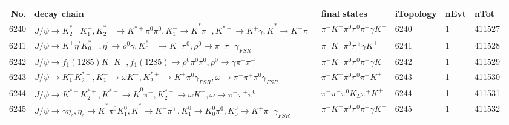 \begin{table}[htbp] 
\begin{center}
\begin{small}
\begin{tabular}{rlllll}\hline\hline
 No. & decay chain & final states &  iTopology & nEvt & nTot \\\hline
6240&$J/\psi       \rightarrow K_2^{*+}       K_{1}^{-}      , K_2^{*+}        \rightarrow K^{*+}         \pi^{0}        \pi^{0}        , K_{1}^{-}       \rightarrow \bar{K}^{*}   \pi^{-}        , K^{*+}          \rightarrow K^{+}          \gamma       , \bar{K}^{*}    \rightarrow K^{-}          \pi^{+}        $&$\pi^{-}        K^{-}          \pi^{0}        \pi^{0}        \pi^{+}        \gamma       K^{+}          $& 6240&    1&411527\\
6241&$J/\psi       \rightarrow K^{+}          \eta^{\prime} K_{0}^{*-}     , \eta^{\prime}  \rightarrow \rho^{0}      \gamma       , K_{0}^{*-}      \rightarrow K^{-}          \pi^{0}        , \rho^{0}       \rightarrow \pi^{+}        \pi^{-}        \gamma_{FSR} $&$\pi^{-}        K^{-}          \pi^{0}        \pi^{+}        \gamma       K^{+}          $& 6241&    1&411528\\
6242&$J/\psi       \rightarrow f_{1}(1285)    K^{-}          K^{+}          , f_{1}(1285)     \rightarrow \rho^{0}      \pi^{0}        \pi^{0}        , \rho^{0}       \rightarrow \gamma       \pi^{+}        \pi^{-}        $&$\pi^{-}        K^{-}          \pi^{0}        \pi^{0}        \pi^{+}        \gamma       K^{+}          $& 6242&    1&411529\\
6243&$J/\psi       \rightarrow K_{1}^{-}      K_2^{*+}       , K_{1}^{-}       \rightarrow \omega         K^{-}          , K_2^{*+}        \rightarrow K^{+}          \pi^{0}        \gamma_{FSR} , \omega          \rightarrow \pi^{-}        \pi^{+}        \pi^{0}        \gamma_{FSR} $&$\pi^{-}        K^{-}          \pi^{0}        \pi^{0}        \pi^{+}        K^{+}          $& 6243&    1&411530\\
6244&$J/\psi       \rightarrow K^{*-}         K_2^{*+}       , K^{*-}          \rightarrow \bar{K}^{0}   \pi^{-}        , K_2^{*+}        \rightarrow \omega         K^{+}          , \omega          \rightarrow \pi^{-}        \pi^{+}        \pi^{0}        $&$\pi^{-}        \pi^{-}        \pi^{0}        K_{L}          \pi^{+}        K^{+}          $& 6244&    1&411531\\
6245&$J/\psi       \rightarrow \gamma       \eta_{c}    , \eta_{c}     \rightarrow \bar{K}^{*}   \pi^{0}        K_1^{0}        , \bar{K}^{*}    \rightarrow K^{-}          \pi^{+}        , K_1^{0}         \rightarrow K_0^{0}        \pi^{0}        , K_0^{0}         \rightarrow K^{+}          \pi^{-}        \gamma_{FSR} $&$\pi^{-}        K^{-}          \pi^{0}        \pi^{0}        \pi^{+}        \gamma       K^{+}          $& 6245&    1&411532\\

\end{tabular}
\end{small}
\end{center}
\end{table}
